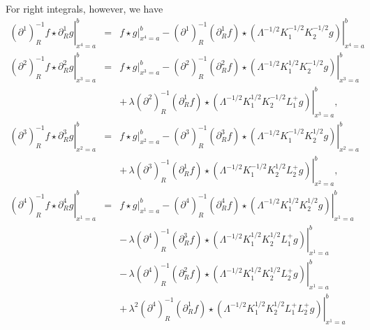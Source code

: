 \documentclass[a4paper,11pt,oneside]{article}
\begin{document}
For right integrals, however, we have 
\begin{eqnarray}
\left. \left( \partial ^{1}\right) _{R}^{-1}f\star \partial _{R}^{1}g\right|
_{x^{4}=a}^{b} &=&\left. f\star g\right| _{x^{4}=a}^{b}-\left. \left(
\partial ^{1}\right) _{R}^{-1}\left( \partial _{R}^{1}f\right) \star \left(
\Lambda ^{-1/2}K_{1}^{-1/2}K_{2}^{-1/2}g\right) \right| _{x^{4}=a}^{b} \\
\left. \left( \partial ^{2}\right) _{R}^{-1}f\star \partial _{R}^{2}g\right|
_{x^{3}=a}^{b} &=&\left. f\star g\right| _{x^{3}=a}^{b}-\left. \left(
\partial ^{2}\right) _{R}^{-1}\left( \partial _{R}^{2}f\right) \star \left(
\Lambda ^{-1/2}K_{1}^{1/2}K_{2}^{-1/2}g\right) \right| _{x^{3}=a}^{b} 
\nonumber \\
&&+\,\lambda \left. \left( \partial ^{2}\right) _{R}^{-1}\left( \partial
_{R}^{1}f\right) \star \left( \Lambda
^{-1/2}K_{1}^{1/2}K_{2}^{-1/2}L_{1}^{+}g\right) \right| _{x^{3}=a}^{b}, 
\nonumber \\
\left. \left( \partial ^{3}\right) _{R}^{-1}f\star \partial _{R}^{3}g\right|
_{x^{2}=a}^{b} &=&\left. f\star g\right| _{x^{2}=a}^{b}-\left. \left(
\partial ^{3}\right) _{R}^{-1}\left( \partial _{R}^{3}f\right) \star \left(
\Lambda ^{-1/2}K_{1}^{-1/2}K_{2}^{1/2}g\right) \right| _{x^{2}=a}^{b} 
\nonumber \\
&&+\,\lambda \left. \left( \partial ^{3}\right) _{R}^{-1}\left( \partial
_{R}^{1}f\right) \star \left( \Lambda
^{-1/2}K_{1}^{-1/2}K_{2}^{1/2}L_{2}^{+}g\right) \right| _{x^{2}=a}^{b}, 
\nonumber \\
\left. \left( \partial ^{4}\right) _{R}^{-1}f\star \partial _{R}^{4}g\right|
_{x^{1}=a}^{b} &=&\left. f\star g\right| _{x^{1}=a}^{b}-\left. \left(
\partial ^{4}\right) _{R}^{-1}\left( \partial _{R}^{4}f\right) \star \left(
\Lambda ^{-1/2}K_{1}^{1/2}K_{2}^{1/2}g\right) \right| _{x^{1}=a}^{b} 
\nonumber \\
&&-\,\lambda \left. \left( \partial ^{4}\right) _{R}^{-1}\left( \partial
_{R}^{3}f\right) \star \left( \Lambda
^{-1/2}K_{1}^{1/2}K_{2}^{1/2}L_{1}^{+}g\right) \right| _{x^{1}=a}^{b} 
\nonumber \\
&&-\,\lambda \left. \left( \partial ^{4}\right) _{R}^{-1}\left( \partial
_{R}^{2}f\right) \star \left( \Lambda
^{-1/2}K_{1}^{1/2}K_{2}^{1/2}L_{2}^{+}g\right) \right| _{x^{1}=a}^{b} 
\nonumber \\
&&+\,\lambda ^{2}\left. \left( \partial ^{4}\right) _{R}^{-1}\left( \partial
_{R}^{1}f\right) \star \left( \Lambda
^{-1/2}K_{1}^{1/2}K_{2}^{1/2}L_{1}^{+}L_{2}^{+}g\right) \right|
_{x^{1}=a}^{b}  \nonumber
\end{eqnarray}
\end{document}
